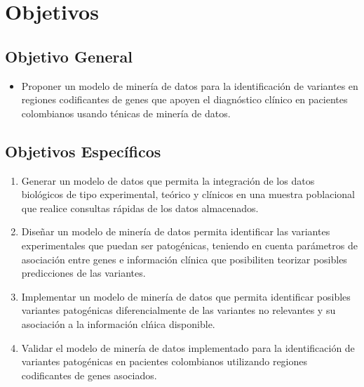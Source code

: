 \section*{Objetivos}

\subsection*{Objetivo General}%

\begin{itemize}
	\item Proponer un modelo de miner\'ia de datos para la identificaci\'on de variantes en regiones codificantes de genes  que apoyen el  diagn\'ostico cl\'inico en pacientes colombianos usando t\'enicas de miner\'ia de datos.
\end{itemize}

\subsection*{Objetivos Espec\'ificos}

\begin{enumerate}
	\item Generar un modelo de datos que permita la integraci\'on de los datos biol\'ogicos de tipo experimental, te\'orico y cl\'inicos en una  muestra poblacional que realice consultas r\'apidas de los datos almacenados.
	\item Dise\~nar un modelo de miner\'ia de datos permita identificar las variantes experimentales que puedan ser patog\'enicas, teniendo en cuenta par\'ametros de asociaci\'on entre genes e informaci\'on cl\'inica que posibiliten teorizar posibles predicciones de las variantes. 
	\item Implementar un  modelo de miner\'ia de datos que permita identificar posibles variantes patog\'enicas diferencialmente de las variantes no relevantes y  su asociaci\'on a la informaci\'on cl\'nica disponible.
	\item Validar el modelo de miner\'ia de datos implementado para la identificaci\'on de variantes patog\'enicas en pacientes colombianos utilizando regiones codificantes de genes asociados.  
\end{enumerate}
